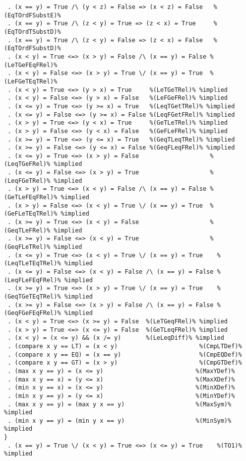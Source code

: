 \begin{Verbatim}
 . (x == y) = True /\ (y < z) = False => (x < z) = False   %(EqTOrdFSubstE)%
 . (x == y) = True /\ (z < y) = True => (z < x) = True     %(EqTOrdTSubstD)%
 . (x == y) = True /\ (z < y) = False => (z < x) = False   %(EqTOrdFSubstD)%
 . (x < y) = True <=> (x > y) = False /\ (x == y) = False %(LeTGeFEqFRel)%
 . (x < y) = False <=> (x > y) = True \/ (x == y) = True  %(LeFGeTEqTRel)%
 . (x < y) = True <=> (y > x) = True     %(LeTGeTRel)% %implied
 . (x < y) = False <=> (y > x) = False   %(LeFGeFRel)% %implied
 . (x <= y) = True <=> (y >= x) = True   %(LeqTGetTRel)% %implied
 . (x <= y) = False <=> (y >= x) = False %(LeqFGetFRel)% %implied
 . (x > y) = True <=> (y < x) = True     %(GeTLeTRel)% %implied
 . (x > y) = False <=> (y < x) = False   %(GeFLeFRel)% %implied
 . (x >= y) = True <=> (y <= x) = True   %(GeqTLeqTRel)% %implied
 . (x >= y) = False <=> (y <= x) = False %(GeqFLeqFRel)% %implied
 . (x <= y) = True <=> (x > y) = False                    %(LeqTGeFRel)% %implied
 . (x <= y) = False <=> (x > y) = True                    %(LeqFGeTRel)% %implied
 . (x > y) = True <=> (x < y) = False /\ (x == y) = False %(GeTLeFEqFRel)% %implied
 . (x > y) = False <=> (x < y) = True \/ (x == y) = True  %(GeFLeTEqTRel)% %implied
 . (x >= y) = True <=> (x < y) = False                    %(GeqTLeFRel)% %implied
 . (x >= y) = False <=> (x < y) = True                    %(GeqFLeTRel)% %implied
 . (x <= y) = True <=> (x < y) = True \/ (x == y) = True    %(LeqTLeTEqTRel)% %implied
 . (x <= y) = False <=> (x < y) = False /\ (x == y) = False %(LeqFLeFEqFRel)% %implied
 . (x >= y) = True <=> (x > y) = True \/ (x == y) = True    %(GeqTGeTEqTRel)% %implied
 . (x >= y) = False <=> (x > y) = False /\ (x == y) = False %(GeqFGeFEqFRel)% %implied
 . (x < y) = True <=> (x >= y) = False  %(LeTGeqFRel)% %implied
 . (x > y) = True <=> (x <= y) = False  %(GeTLeqFRel)% %implied
 . (x < y) = (x <= y) && (x /= y)       %(LeLeqDiff)% %implied
 . (compare x y == LT) = (x < y)                       %(CmpLTDef)%
 . (compare x y == EQ) = (x == y)                      %(CmpEQDef)%
 . (compare x y == GT) = (x > y)                       %(CmpGTDef)%
 . (max x y == y) = (x <= y)                          %(MaxYDef)%
 . (max x y == x) = (y <= x)                          %(MaxXDef)%
 . (min x y == x) = (x <= y)                          %(MinXDef)%
 . (min x y == y) = (y <= x)                          %(MinYDef)%
 . (max x y == y) = (max y x == y)                    %(MaxSym)% %implied
 . (min x y == y) = (min y x == y)                    %(MinSym)% %implied
}
 . (x == y) = True \/ (x < y) = True <=> (x <= y) = True    %(TO1)% %implied

\end{Verbatim}
